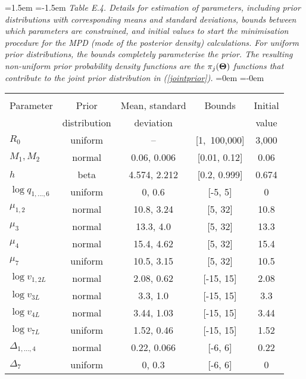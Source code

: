 \documentclass[11pt]{article}   %
\def\AppLet{E}                   %
\def\gcomm{7}                    %
\def\bfTh{{\bf \Theta}}          %
\def\vsd{\vspace*{1ex}}     %
\newcommand{\eref}[1]{(\ref{#1})}
\begin{document}
\begin{table}[tp]
\leftskip=1.5em
\parindent=-1.5em
{\it Table \AppLet.4. Details for estimation of parameters, including prior distributions with corresponding means and standard deviations, bounds between which parameters are constrained, and initial values to start the minimisation procedure for the MPD (mode of the posterior density) calculations. For uniform prior distributions, the bounds completely parameterise the prior. The resulting non-uniform prior probability density functions are the $\pi_j(\bfTh)$ functions that contribute to the joint prior distribution in \eref{jointprior}.}
\leftskip=0em
\parindent=-0em
\begin{center}
\begin{tabular}{lcccc} 
\hline \\[-1.5ex]
Parameter & Prior         & Mean, standard & Bounds & Initial\\ 
          &  distribution &  deviation     &  & value\\ 
\hline %
$R_0$ & uniform & -- & [1,~100,000] & 3,000\\
$M_{1}, M_{2}$ & normal & 0.06, 0.006 & [0.01, 0.12] & 0.06\\
$h$ & beta & 4.574, 2.212 & [0.2, 0.999] & 0.674\\
$\log q_{1,...,6}$ & uniform & 0, 0.6 & [-5, 5] & 0\\
$\mu_{1,2}$ & normal & 10.8, 3.24 & [5, 32] & 10.8\\
$\mu_{3}$ & normal & 13.3, 4.0 & [5, 32] & 13.3\\
$\mu_{4}$ & normal & 15.4, 4.62 & [5, 32] & 15.4\\
$\mu_{\gcomm}$ & uniform & 10.5, 3.15 & [5, 32] & 10.5\\
$\log v_{1,2L}$ & normal & 2.08, 0.62 & [-15, 15] & 2.08\\
$\log v_{3L}$ & normal & 3.3, 1.0 & [-15, 15] & 3.3\\
$\log v_{4L}$ & normal & 3.44, 1.03 & [-15, 15] & 3.44\\
$\log v_{\gcomm L}$ & uniform & 1.52, 0.46 & [-15, 15] & 1.52\\
$\Delta_{1,...,4}$ & normal & 0.22, 0.066 & [-6, 6] & 0.22\\
$\Delta_{\gcomm}$ & uniform & 0, 0.3 & [-6, 6] & 0\\
\hline 
\end{tabular} 
\vsd
\end{center}
\end{table}
\end{document}
